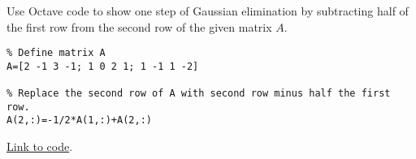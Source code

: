 \documentclass{ximera}
\begin{document}
\begin{example}\label{ex:gauss_octave}
Use Octave code to show one step of Gaussian elimination by subtracting half of the first row from the second row of the given matrix $A$.
\begin{verbatim}
% Define matrix A
A=[2 -1 3 -1; 1 0 2 1; 1 -1 1 -2] 

% Replace the second row of A with second row minus half the first row.  
A(2,:)=-1/2*A(1,:)+A(2,:)  
\end{verbatim}

\href{https://sagecell.sagemath.org/?z=eJxNjMsKwjAURPeB_MNsCvVRNXGndHHBL3ArLkK9IYE2kSRSP99YN26Gw5lhGlzY-sCYTEn-DZKC-ptGp3CscYbCARoLVFdD3yGFFA2u_BzNwCiOkXmI4YEUZ0QLwuyL-5eTD68MZ0a7zK1PuXyLHeoZtXp7WvWd2us1tary5qc-770qUw==&lang=octave&interacts=eJyLjgUAARUAuQ==}{Link to code}.
\end{example}
\end{document}
